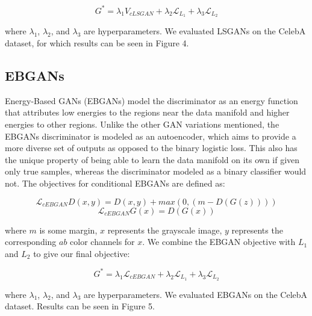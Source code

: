 \documentclass[10pt]{article}
\begin{document}
\[ G^* = \lambda_1 V_{cLSGAN} + \lambda_2 \mathcal{L}_{L_1} + \lambda_3 \mathcal{L}_{L_2} \]

\noindent where $\lambda_1$, $\lambda_2$, and $\lambda_3$ are hyperparameters. We evaluated LSGANs on
the CelebA dataset, for which results can be seen in Figure 4.

\subsection{EBGANs}
Energy-Based GANs (EBGANs) model the discriminator as an energy function that attributes low energies to
the regions near the data manifold and higher energies to other regions. Unlike the other GAN variations
mentioned, the EBGANs discriminator is modeled as an autoencoder, which aims to provide a more diverse
set of outputs as opposed to the binary logistic loss. This also has the unique property of being able to learn the data
manifold on its own if given only true samples, whereas the discriminator modeled as a binary classifier would not.
The objectives for conditional EBGANs are defined as:

\[\mathcal{L}_{cEBGAN} D(x,y) = D(x,y) + max(0, (m-D(G(z)))) \]
\[\mathcal{L}_{cEBGAN} G(x) = D(G(x)) \]


\noindent where $m$ is some margin, $x$ represents the grayscale image, $y$ represents the corresponding
$ab$ color channels for $x$. We combine the EBGAN objective with $L_1$ and $L_2$ to give our final objective:

\[ G^* = \lambda_1 \mathcal{L}_{cEBGAN} + \lambda_2 \mathcal{L}_{L_1} + \lambda_3 \mathcal{L}_{L_2} \]

\noindent where $\lambda_1$, $\lambda_2$, and $\lambda_3$ are hyperparameters. We evaluated EBGANs on
the CelebA dataset. Results can be seen in Figure 5.
\end{document}
